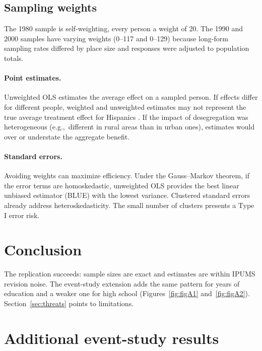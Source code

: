 \documentclass[11pt]{article}
\begin{document}
\subsection{Sampling weights}
\label{sec:weights}

The 1980 sample is self-weighting, every person a weight of 20. The 1990 and 2000 samples have varying weights (0--117 and 0--129) because long-form sampling rates differed by place size and responses were adjusted to population totals.

\paragraph{Point estimates.} Unweighted OLS estimates the average effect on a sampled person. If effects differ for different people, weighted and unweighted estimates may not represent the true average treatment effect for Hispanics \citep{solon2015}. If the impact of desegregation was heterogeneous (e.g.,\ different in rural areas than in urban ones), estimates would over or understate the aggregate benefit.

\paragraph{Standard errors.} Avoiding weights can maximize efficiency. Under the Gauss--Markov theorem, if the error terms are homoskedastic, unweighted OLS provides the best linear unbiased estimator (BLUE) with the lowest variance. Clustered standard errors already address heteroskedasticity. The small number of clusters presents a Type I error risk.

\section{Conclusion}
\label{sec:conclusion}

The replication succeeds: sample sizes are exact and estimates are within IPUMS revision noise. The event-study extension adds the same pattern for years of education and a weaker one for high school (Figures~\ref{fig:figA1} and~\ref{fig:figA2}). Section~\ref{sec:threats} points to limitations.

\appendix

\setcounter{figure}{0}
\setcounter{table}{0}
\renewcommand{\thefigure}{A\arabic{figure}}
\renewcommand{\thetable}{A\arabic{table}}

\section{Additional event-study results}
\label{app:eventstudy}
\end{document}
